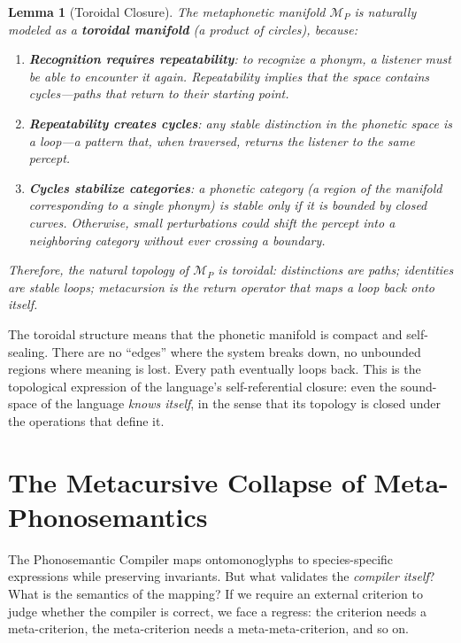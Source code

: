 \documentclass[12pt, letterpaper]{book}
\newtheorem{lemma}[theorem]{Lemma}
\begin{document}
\begin{lemma}[Toroidal Closure]\label{lem:torus}
The metaphonetic manifold $\mathcal{M}_P$ is naturally modeled as a \textbf{toroidal manifold} (a product of circles), because:
\begin{enumerate}[label=(\roman*)]
    \item \textbf{Recognition requires repeatability}: to recognize a phonym, a listener must be able to encounter it again. Repeatability implies that the space contains cycles---paths that return to their starting point.
    \item \textbf{Repeatability creates cycles}: any stable distinction in the phonetic space is a loop---a pattern that, when traversed, returns the listener to the same percept.
    \item \textbf{Cycles stabilize categories}: a phonetic category (a region of the manifold corresponding to a single phonym) is stable only if it is bounded by closed curves. Otherwise, small perturbations could shift the percept into a neighboring category without ever crossing a boundary.
\end{enumerate}
Therefore, the natural topology of $\mathcal{M}_P$ is toroidal: distinctions are paths; identities are stable loops; metacursion is the return operator that maps a loop back onto itself.
\end{lemma}

The toroidal structure means that the phonetic manifold is compact and self-sealing. There are no ``edges'' where the system breaks down, no unbounded regions where meaning is lost. Every path eventually loops back. This is the topological expression of the language's self-referential closure: even the sound-space of the language \textit{knows itself}, in the sense that its topology is closed under the operations that define it.


\section{The Metacursive Collapse of Meta-Phonosemantics}

The Phonosemantic Compiler maps ontomonoglyphs to species-specific expressions while preserving invariants. But what validates the \textit{compiler itself}? What is the semantics of the mapping? If we require an external criterion to judge whether the compiler is correct, we face a regress: the criterion needs a meta-criterion, the meta-criterion needs a meta-meta-criterion, and so on.
\end{document}
